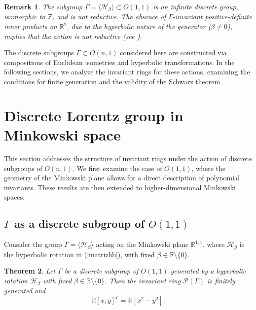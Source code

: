 \documentclass[]{article}
\newtheorem{theorem}{Theorem}[section]
\newtheorem{remark}[theorem]{Remark}
\begin{document}
\begin{remark}
	The subgroup $\Gamma = \langle \mathcal{H}_\beta \rangle \subset O(1,1)$ is an infinite discrete group, isomorphic to $\mathbb{Z}$, and is not reductive. The absence of $\Gamma$-invariant positive-definite inner products on $\mathbb{R}^2$, due to the hyperbolic nature of the generator ($\beta \neq 0$), implies that the action is not reductive (see \cite[p.~125]{Humphreys1975}).
\end{remark}

The discrete subgroups $\Gamma \subset O(n,1)$ considered here are constructed via compositions of Euclidean isometries and hyperbolic transformations. In the following sections, we analyze the invariant rings for these actions, examining the conditions for finite generation and the validity of the Schwarz theorem.


\section{Discrete Lorentz group in Minkowski space}

This section addresses the structure of invariant rings under the action of discrete subgroups of $O(n,1)$. We first examine the case of $O(1,1)$, where the geometry of the Minkowski plane allows for a direct description of polynomial invariants. These results are then extended to higher-dimensional Minkowski spaces.


\subsection{$\Gamma$ as a discrete subgroup of $O(1,1)$}

Consider the group $\Gamma = \langle \mathcal{H}_\beta \rangle$ acting on the Minkowski plane $\mathbb{R}^{1,1}$, where $\mathcal{H}_\beta$ is the hyperbolic rotation in (\ref{matrizhb}), with fixed
$ \beta \in \mathbb{R} \setminus \{0\}.$

\begin{theorem}\label{teorema31}
	Let $\Gamma$ be a discrete subgroup of $O(1,1)$ generated by a hyperbolic rotation $\mathcal{H}_\beta$ with fixed $\beta \in \mathbb{R} \setminus \{0\}$. Then the invariant ring $\mathcal{P}(\Gamma)$ is finitely generated and
	$$
	\mathbb{R}[x,y]^\Gamma = \mathbb{R}[x^2 - y^2].
	$$
\end{theorem}
\end{document}
